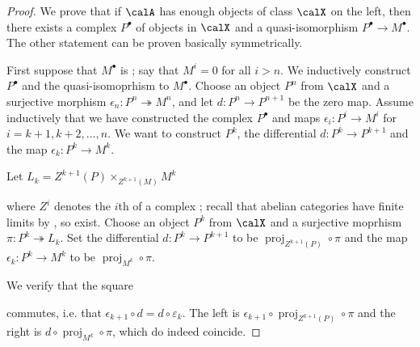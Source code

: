 \begin{proof}
    We prove that if $\calA$ has enough objects of class $\calX$ on the left, then there exists a complex $P^\bullet$ of objects in $\calX$ and a quasi-isomorphism $P^\bullet \to M^\bullet$. The other statement can be proven basically symmetrically.

    First suppose that $M^\bullet$ is ; say that $M^i = 0$ for all $i > n$. We inductively construct $P^\bullet$ and the quasi-isomoprhism to $M^\bullet$. Choose an object $P^n$ from $\calX$ and a surjective morphism $\epsilon_n: P^n \twoheadrightarrow M^n$, and let $d: P^n \to P^{n+1}$ be the zero map. Assume inductively that we have constructed the complex $P^\bullet$ and maps $\epsilon_i: P^i \to M^i$ for $i = k+1,k+2,\ldots,n$. We want to construct $P^k$, the differential $d:P^k \to P^{k+1}$ and the map $\epsilon_k: P^k \to M^k$. 

    Let $L_k = Z^{k+1}(P) \times_{Z^{k+1}(M)} M^k$
    \begin{center}
    \end{center}
    
    where $Z^{i}$ denotes the $i$th  of a complex ; recall that abelian categories have finite limits by , so  exist. Choose an object $P^k$ from $\calX$ and a surjective moprhism $\pi: P^k \twoheadrightarrow L_k$. Set the differential $d: P^k \to P^{k+1}$ to be $\operatorname{proj}_{Z^{k+1}(P)} \circ \pi$ and the map $\epsilon_k: P^k \to M^k$ to be $\operatorname{proj}_{M^k} \circ \pi$. 
    
    We verify that the square
    \begin{center}
    \end{center}
    commutes, i.e. that $\epsilon_{k+1} \circ d = d \circ \varepsilon_k$. The left is $\epsilon_{k+1} \circ \operatorname{proj}_{Z^{k+1}(P)} \circ \pi$ and the right is $d \circ \operatorname{proj}_{M^k} \circ \pi$, which do indeed coincide. 


\end{proof}

